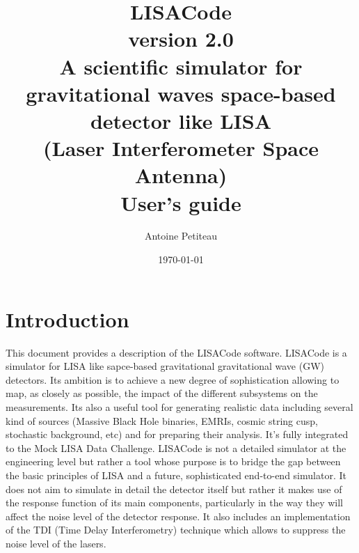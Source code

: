 \documentclass[a4paper,english,12pt]{article}
\begin{document}
\title{
\Huge \bf LISACode \\ 
\vspace{0.5cm}
\Large version 2.0\\
\vspace{2cm}
\LARGE A scientific simulator for gravitational waves space-based detector like LISA \\
\vspace{0.3cm}
\large (Laser Interferometer Space Antenna) \\
\vspace{1cm}
\Huge User's guide
 }
\author{
Antoine Petiteau}

\date{\today}
\maketitle

\setcounter{page}{1}

\newpage

\hphantom{a}

\newpage


\tableofcontents


\newpage


\section{Introduction}
\label{SIntro}

This document provides a description of the LISACode software. LISACode is a simulator for LISA like sapce-based gravitational  gravitational wave (GW) detectors. 
Its ambition is to achieve a new degree of sophistication allowing to map, as closely as possible, the impact of the different subsystems on the measurements.  Its also a useful tool for generating realistic data including several kind of sources (Massive Black Hole binaries, EMRIs, cosmic string cusp, stochastic background, etc) and for preparing their analysis. It’s fully integrated to the Mock LISA Data Challenge.  LISACode is not a detailed simulator at the engineering level but rather a tool whose purpose is to bridge the gap between the basic principles of LISA and a future, sophisticated end-to-end simulator.
It does not aim to simulate in detail the detector itself but rather it makes use of the response function of its main components, particularly in the way they will affect the noise level of the detector response.
It also includes an implementation of the TDI (Time Delay Interferometry) technique which allows to suppress the noise level of the lasers. \\
\end{document}
